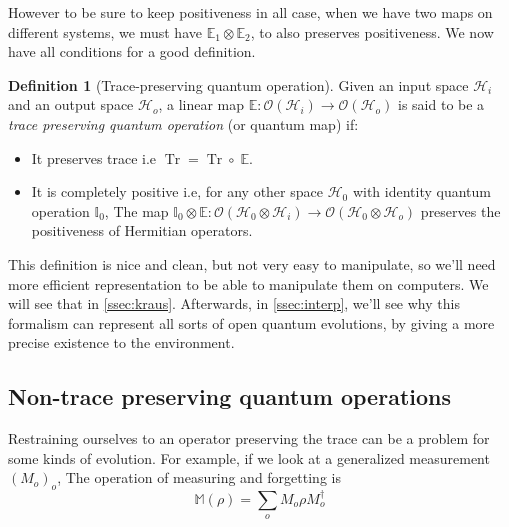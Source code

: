 \documentclass[10pt,a4paper]{report}
\theoremstyle{plain}
\theoremstyle{definition}
\newtheorem{defn}{Definition}[chapter]
\theoremstyle{remark}
\DeclareMathOperator{\Tr}{Tr}
\begin{document}
However to be sure to keep positiveness in all case, when we have two maps on
different systems, we must have $\mathbb{E}_1
\otimes \mathbb{E}_2$, to also preserves positiveness. We now have all
conditions for a good definition.

\begin{defn}[Trace-preserving quantum operation]\label{def:tpqo}
  Given an input space $\mathcal{H}_i$ and an output space $\mathcal{H}_o$, a
  linear map $\mathbb E : \mathcal{O}(\mathcal{H}_i) \to
  \mathcal{O}(\mathcal{H}_o)$ is said to be a \emph{trace preserving quantum
    operation} (or quantum map) if:
  \begin{itemize}
  \item It preserves trace i.e $\Tr = \Tr \circ\; \mathbb E$.
  \item It is completely positive i.e, for any other space $\mathcal{H}_0$ with
    identity quantum operation $\mathbb I_0$, The map $\mathbb I_0 \otimes
    \mathbb E : \mathcal{O}(\mathcal{H}_0 \otimes \mathcal{H}_i) \to
    \mathcal{O}(\mathcal{H}_0 \otimes \mathcal{H}_o)$ preserves the positiveness
    of Hermitian operators.
  \end{itemize}
\end{defn}

This definition is nice and clean, but not very easy to manipulate, so we'll
need more efficient representation to be able to manipulate them on computers.
We will see that in \cref{ssec:kraus}. Afterwards, in \cref{ssec:interp}, we'll see
why this formalism can represent all sorts of open quantum evolutions, by giving
a more precise existence to the environment.

\subsection{Non-trace preserving quantum operations}

Restraining ourselves to an operator preserving the trace can be a problem for
some kinds of evolution. For example, if we look at a generalized measurement
${(M_o)}_o$, The operation of measuring and forgetting is
\[\mathbb{M}(\rho) = \sum_o M_o \rho M_o^\dagger\]
\end{document}
